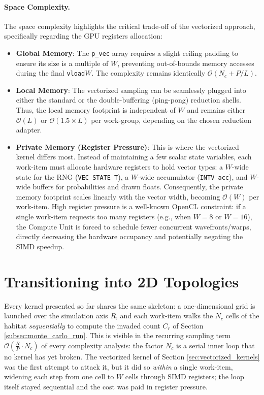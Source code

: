\paragraph{Space Complexity.}
The space complexity highlights the critical trade-off of the vectorized approach, specifically regarding the GPU registers allocation:
\begin{itemize}
    \item \textbf{Global Memory}: The \texttt{p\_vec} array requires a slight ceiling padding to ensure its size is a multiple of $W$, preventing out-of-bounds memory accesses during the final \texttt{vload$W$}. The complexity remains identically $\mathcal{O}(N_c + P/L)$.
    
    \item \textbf{Local Memory}: The vectorized sampling can be seamlessly plugged into either the standard or the double-buffering (ping-pong) reduction shells. Thus, the local memory footprint is independent of $W$ and remains either $\mathcal{O}(L)$ or $\mathcal{O}(1.5 \times L)$ per work-group, depending on the chosen reduction adapter.
    
    \item \textbf{Private Memory (Register Pressure)}: This is where the vectorized kernel differs most. Instead of maintaining a few scalar state variables, each work-item must allocate hardware registers to hold vector types: a $W$-wide state for the RNG (\texttt{VEC\_STATE\_T}), a $W$-wide accumulator (\texttt{INTV acc}), and $W$-wide buffers for probabilities and drawn floats. 
    Consequently, the private memory footprint scales linearly with the vector width, becoming $\mathcal{O}(W)$ per work-item. High register pressure is a well-known OpenCL constraint: if a single work-item requests too many registers (e.g., when $W=8$ or $W=16$), the Compute Unit is forced to schedule fewer concurrent wavefronts/warps, directly decreasing the hardware occupancy and potentially negating the SIMD speedup.
\end{itemize}

\section{Transitioning into 2D Topologies}\label{sec:kernel_2d}
Every kernel presented so far shares the same skeleton: a one-dimensional grid is launched over the simulation axis $R$, and each work-item walks the $N_c$ cells of the habitat \emph{sequentially} to compute the invaded count $C_r$ of Section \ref{subsec:monte_carlo_run}. This is visible in the recurring sampling term $\mathcal{O}\!\left(\frac{R}{P}\cdot N_c\right)$ of every complexity analysis: the factor $N_c$ is a serial inner loop that no kernel has yet broken. The vectorized kernel of Section \ref{sec:vectorized_kernels} was the first attempt to attack it, but it did so \emph{within} a single work-item, widening each step from one cell to $W$ cells through SIMD registers; the loop itself stayed sequential and the cost was paid in register pressure.

